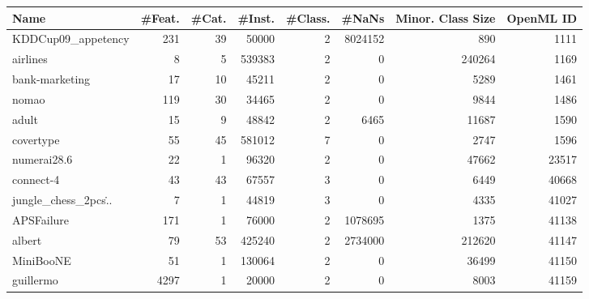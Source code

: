 \begin{tabular}{lrrrrrrr}
\toprule
 Name & \#Feat. &  \#Cat. &  \#Inst. &  \#Class. &  \#NaNs &  Minor. Class Size & OpenML ID \\
\midrule
                    KDDCup09\_appetency &         231 &                      39 &        50000 &          2 & 8024152 &                  890 &  1111 \\
                              airlines &           8 &                       5 &       539383 &          2 &       0 &               240264 &  1169 \\
                        bank-marketing &          17 &                      10 &        45211 &          2 &       0 &                 5289 &  1461 \\
                                 nomao &         119 &                      30 &        34465 &          2 &       0 &                 9844 &  1486 \\
                                 adult &          15 &                       9 &        48842 &          2 &    6465 &                11687 &  1590 \\
                             covertype &          55 &                      45 &       581012 &          7 &       0 &                 2747 &  1596 \\
                           numerai28.6 &          22 &                       1 &        96320 &          2 &       0 &                47662 & 23517 \\
                             connect-4 &          43 &                      43 &        67557 &          3 &       0 &                 6449 & 40668 \\
jungle\_chess\_2pcs\... &           7 &                       1 &        44819 &          3 &       0 &                 4335 & 41027 \\
                            APSFailure &         171 &                       1 &        76000 &          2 & 1078695 &                 1375 & 41138 \\
                                albert &          79 &                      53 &       425240 &          2 & 2734000 &               212620 & 41147 \\
                             MiniBooNE &          51 &                       1 &       130064 &          2 &       0 &                36499 & 41150 \\
                             guillermo &        4297 &                       1 &        20000 &          2 &       0 &                 8003 & 41159 \\

\end{tabular}
